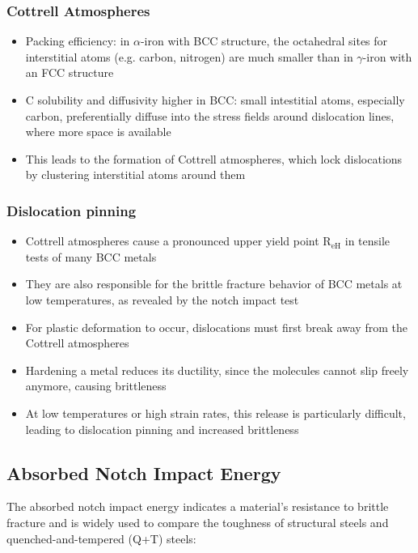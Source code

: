 \documentclass{article}
\begin{document}
\subsubsection{Cottrell Atmospheres}
\begin{itemize}
  \item Packing efficiency: in $\alpha$-iron with BCC structure, the octahedral sites for interstitial atoms (e.g. carbon, nitrogen) are much smaller than in $\gamma$-iron with an FCC structure
  \item C solubility and diffusivity higher in BCC: small intestitial atoms, especially carbon, preferentially diffuse into the stress fields around dislocation lines, where more space is available
  \item This leads to the formation of Cottrell atmospheres, which lock dislocations by clustering interstitial atoms around them
\end{itemize}

\newpage
\subsubsection{Dislocation pinning}
\begin{itemize}
  \item Cottrell atmospheres cause a pronounced upper yield point R$_\text{eH}$ in tensile tests of many BCC metals
  \item They are also responsible for the brittle fracture behavior of BCC metals at low temperatures, as revealed by the notch impact test
  \item For plastic deformation to occur, dislocations must first break away from the Cottrell atmospheres
  \item Hardening a metal reduces its ductility, since the molecules cannot slip freely anymore, causing brittleness
  \item At low temperatures or high strain rates, this release is particularly difficult, leading to dislocation pinning and increased brittleness
\end{itemize}

\subsection{Absorbed Notch Impact Energy}
The absorbed notch impact energy indicates a material's resistance to brittle fracture and is
widely used to compare the toughness of structural steels and quenched-and-tempered (Q+T) steels:
\end{document}
